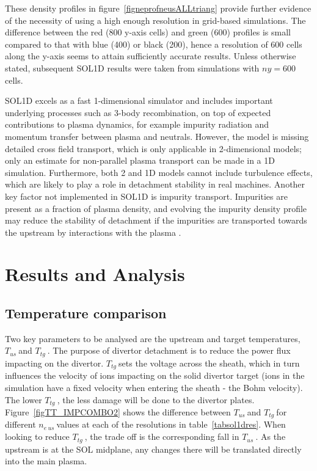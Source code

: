\documentclass[12pt]{article}  %
\providecommand{\neus}{$n_{e~us}~$} %
\providecommand{\Tus}{$T_{us}~$} %
\providecommand{\Ttg}{$T_{tg}~$} %
\begin{document}
These density profiles in figure~\ref{figneprofneusALLtriang} provide further evidence of the necessity of using a high enough resolution in grid-based simulations. The difference between the red (800 y-axis cells) and green (600) profiles is small compared to that with blue (400) or black (200), hence a resolution of 600 cells along the y-axis seems to attain sufficiently accurate results. Unless otherwise stated, subsequent SOL1D results were taken from simulations with $ny = 600$ cells.

SOL1D excels as a fast 1-dimensional simulator and includes important underlying processes such as 3-body recombination, on top of expected contributions to plasma dynamics, for example impurity radiation and momentum transfer between plasma and neutrals. However, the model is missing detailed cross field transport, which is only applicable in 2-dimensional models; only an estimate for non-parallel plasma transport can be made in a 1D simulation. Furthermore, both 2 and 1D models cannot include turbulence effects, which are likely to play a role in detachment stability in real machines. Another key factor not implemented in SOL1D is impurity transport. Impurities are present as a fraction of plasma density, and evolving the impurity density profile may reduce the stability of detachment if the impurities are transported towards the upstream by interactions with the plasma \cite{Nakazawa2000}.

\section{Results and Analysis}\label{secResults}
\subsection{Temperature comparison}\label{ssectempcomp}
Two key parameters to be analysed are the upstream and target temperatures, \Tus and \Ttg. The purpose of divertor detachment is to reduce the power flux impacting on the divertor. \Ttg sets the voltage across the sheath, which in turn influences the velocity of ions impacting on the solid divertor target (ions in the simulation have a fixed velocity when entering the sheath - the Bohm velocity). The lower \Ttg, the less damage will be done to the divertor plates. Figure~\ref{figTT_IMPCOMBO2} shows the difference between \Tus and \Ttg for different \neus values at each of the resolutions in table~\ref{tabsol1dres}. When looking to reduce \Ttg, the trade off is the corresponding fall in \Tus. As the upstream is at the SOL midplane, any changes there will be translated directly into the main plasma. 
\end{document}
